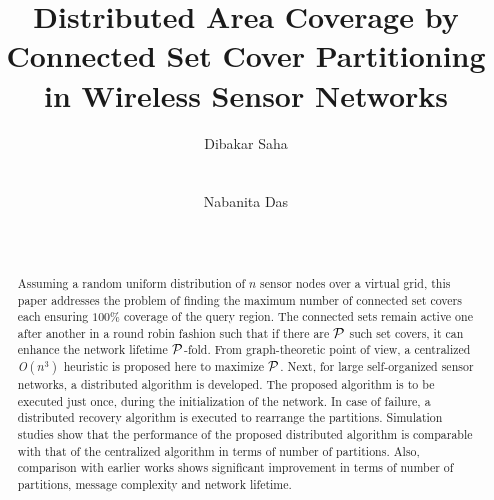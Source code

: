 \documentclass{acm_proc_article-sp}
\begin{document}
\title{Distributed Area Coverage by Connected Set Cover Partitioning in Wireless Sensor Networks}
\author{
\alignauthor
Dibakar Saha \\
      \\
       \\
\alignauthor
Nabanita Das \\
       \\
     \\
       }
     
\maketitle

\begin{abstract}
Assuming a random uniform distribution of $n$ sensor nodes over a virtual grid, this paper addresses the problem of finding the maximum number of
connected set covers each ensuring $100\%$ coverage of the query region. The connected sets remain active one after another in a round robin fashion such that if there are $\cal P$ such set covers, it can enhance the network lifetime
$\cal P$-fold. From graph-theoretic point of view, a centralized {\it O}$(n^3)$ heuristic is proposed here to maximize $\cal P$. Next, for large self-organized sensor networks, a distributed algorithm is developed. The proposed algorithm is to be executed just once, during the initialization of the network. In case of failure, a distributed recovery algorithm is executed to rearrange the partitions. Simulation studies show that the performance of the proposed distributed algorithm is comparable with that of the centralized algorithm in terms of number of partitions. Also, comparison with earlier works shows significant improvement in terms of number of partitions, message complexity and network lifetime. 

\end{abstract}
\end{document}
